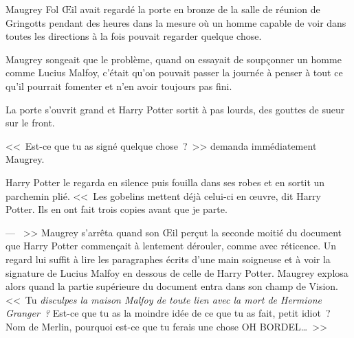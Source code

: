 \later

Maugrey Fol Œil avait regardé la porte en bronze de la salle de réunion de Gringotts pendant des heures dans la mesure où un homme capable de voir dans toutes les directions à la fois pouvait regarder quelque chose.

Maugrey songeait que le problème, quand on essayait de soupçonner un homme comme Lucius Malfoy, c'était qu'on pouvait passer la journée à penser à tout ce qu'il pourrait fomenter et n'en avoir toujours pas fini.

La porte s'ouvrit grand et Harry Potter sortit à pas lourds, des gouttes de sueur sur le front.

<<~Est-ce que tu as signé quelque chose~?~>> demanda immédiatement Maugrey.

Harry Potter le regarda en silence puis fouilla dans ses robes et en sortit un parchemin plié. <<~Les gobelins mettent déjà celui-ci en œuvre, dit Harry Potter. Ils en ont fait trois copies avant que je parte.

--- ~>> Maugrey s'arrêta quand son Œil perçut la seconde moitié du document que Harry Potter commençait à lentement dérouler, comme avec réticence. Un regard lui suffit à lire les paragraphes écrits d'une main soigneuse et à voir la signature de Lucius Malfoy en dessous de celle de Harry Potter. Maugrey explosa alors quand la partie supérieure du document entra dans son champ de Vision. <<~Tu \emph{disculpes la maison Malfoy de toute lien avec la mort de Hermione Granger~?} Est-ce que tu as la moindre idée de ce que tu as fait, petit idiot~? Nom de Merlin, pourquoi est-ce que tu ferais une chose OH BORDEL…~>>
